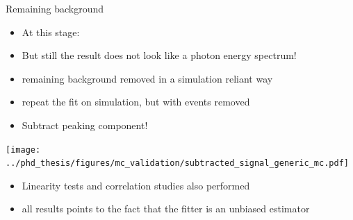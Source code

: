 \documentclass[xcolor=dvipsnames]{beamer}
\begin{document}
\begin{frame}{Remaining background}
\scriptsize\centering
   \begin{itemize}
      \item At this stage:
      \item[\ra] But still the result does not look like a photon energy spectrum!   
      \item[\ra] remaining background removed in a simulation reliant way
      \item[\ra] repeat the fit on simulation, but with \BtoXsgamma events removed
      \item[\ra] Subtract peaking component!  
   \end{itemize}


   \texttt{[image: ../phd\_thesis/figures/mc\_validation/subtracted\_signal\_generic\_mc.pdf]}

   \begin{itemize}
      \item Linearity tests and correlation studies also performed
      \item[\ra] all results points to the fact that the fitter is an unbiased estimator
   \end{itemize}

\end{frame}
\end{document}
